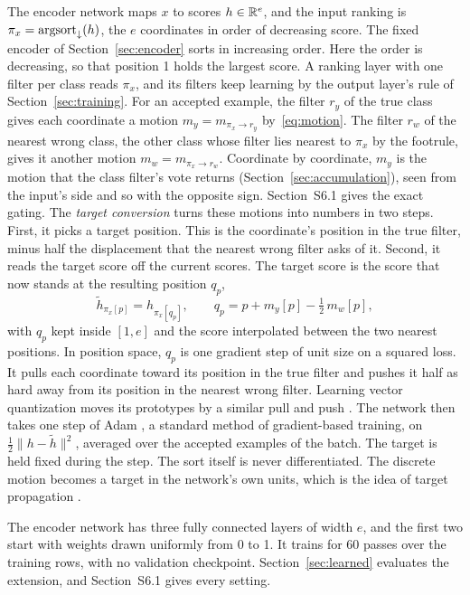 The encoder network maps $x$ to scores $h\in\mathbb{R}^e$, and the input ranking is $\pi_x=\mathrm{argsort}_{\downarrow}(h)$, the $e$ coordinates in order of decreasing score. The fixed encoder of Section~\ref{sec:encoder} sorts in increasing order. Here the order is decreasing, so that position 1 holds the largest score. A ranking layer with one filter per class reads $\pi_x$, and its filters keep learning by the output layer's rule of Section~\ref{sec:training}. For an accepted example, the filter $r_y$ of the true class gives each coordinate a motion $m_y=m_{\pi_x\to r_y}$ by~\eqref{eq:motion}. The filter $r_w$ of the nearest wrong class, the other class whose filter lies nearest to $\pi_x$ by the footrule, gives it another motion $m_w=m_{\pi_x\to r_w}$. Coordinate by coordinate, $m_y$ is the motion that the class filter's vote returns (Section~\ref{sec:accumulation}), seen from the input's side and so with the opposite sign. Section~S6.1 gives the exact gating. The \emph{target conversion} turns these motions into numbers in two steps. First, it picks a target position. This is the coordinate's position in the true filter, minus half the displacement that the nearest wrong filter asks of it. Second, it reads the target score off the current scores. The target score is the score that now stands at the resulting position $q_p$,
\begin{equation}\label{eq:target}
\tilde h_{\pi_x[p]} = h_{\pi_x[q_p]},\qquad q_p = p+m_y[p]-\tfrac12\,m_w[p],
\end{equation}
with $q_p$ kept inside $[1,e]$ and the score interpolated between the two nearest positions. In position space, $q_p$ is one gradient step of unit size on a squared loss. It pulls each coordinate toward its position in the true filter and pushes it half as hard away from its position in the nearest wrong filter. Learning vector quantization moves its prototypes by a similar pull and push \citep{kohonen1990self}. The network then takes one step of Adam \citep{kingma2015adam}, a standard method of gradient-based training, on $\tfrac12\lVert h-\tilde h\rVert^2$, averaged over the accepted examples of the batch. The target is held fixed during the step. The sort itself is never differentiated. The discrete motion becomes a target in the network's own units, which is the idea of target propagation \citep{bengio2014auto,lee2015difference}.



The encoder network has three fully connected layers of width $e$, and the first two start with weights drawn uniformly from 0 to 1. It trains for 60 passes over the training rows, with no validation checkpoint. Section~\ref{sec:learned} evaluates the extension, and Section~S6.1 gives every setting.
